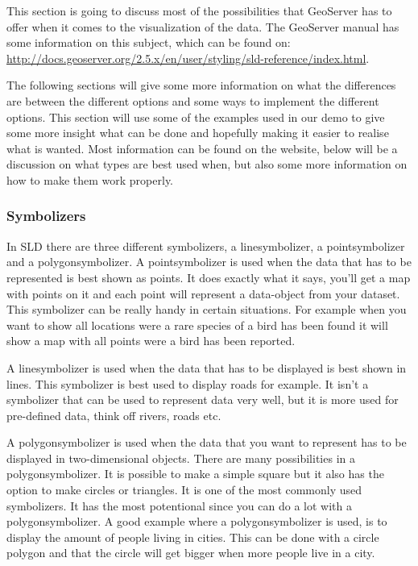 This section is going to discuss most of the possibilities that GeoServer has to offer when it comes to the visualization of the data. The GeoServer manual has some information on this subject, which can be found on: \url{http://docs.geoserver.org/2.5.x/en/user/styling/sld-reference/index.html}.

The following sections will give some more information on what the differences are between the different options and some ways to implement the different options. This section will use some of the examples used in our demo to give some more insight what can be done and hopefully making it easier to realise what is wanted. Most information can be found on the website, below will be a discussion on what types are best used when, but also some more information on how to make them work properly.

\subsubsection{Symbolizers}

In SLD there are three different symbolizers, a linesymbolizer, a pointsymbolizer and a polygonsymbolizer. A pointsymbolizer is used when the data that has to be represented is best shown as points. It does exactly what it says, you'll get a map with points on it and each point will represent a data-object from your dataset. This symbolizer can be really handy in certain situations. For example when you want to show all locations were a rare species of a bird has been found it will show a map with all points were a bird has been reported.

A linesymbolizer is used when the data that has to be displayed is best shown in lines. This symbolizer is best used to display roads for example. It isn't a symbolizer that can be used to represent data very well, but it is more used for pre-defined data, think off rivers, roads etc.

A polygonsymbolizer is used when the data that you want to represent has to be displayed in two-dimensional objects. There are many possibilities in a polygonsymbolizer. It is possible to make a simple square but it also has the option to make circles or triangles. It is one of the most commonly used symbolizers. It has the most potentional since you can do a lot with a polygonsymbolizer. A good example where a polygonsymbolizer is used, is to display the amount of people living in cities. This can be done with a circle polygon and that the circle will get bigger when more people live in a city.

